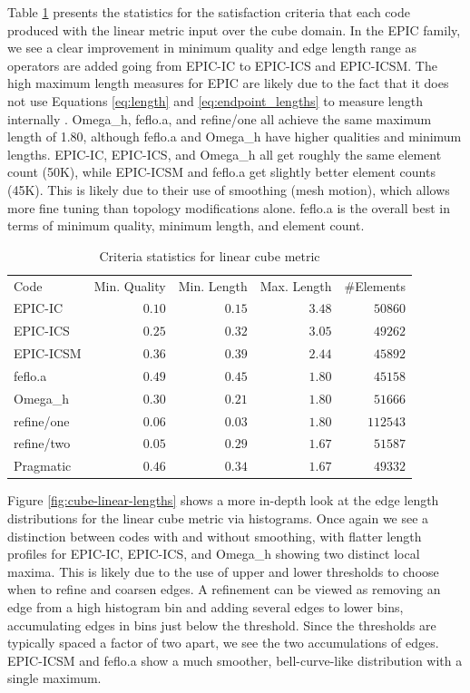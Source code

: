 \documentclass[3p,times,procedia,number]{elsarticle}
\begin{document}
Table \ref{tab:cube-linear-stats} presents the statistics
for the satisfaction criteria that each code
produced with the linear metric input over the cube domain.
In the EPIC family, we see a clear improvement in minimum
quality and edge length range as operators are added
going from EPIC-IC to EPIC-ICS and EPIC-ICSM.
The high maximum length measures for EPIC are likely due
to the fact that it does not use Equations \ref{eq:length}
and \ref{eq:endpoint_lengths} to measure length
internally \cite{park-loseille-krakos-michal-adapt-decomposition}.
Omega\_h, feflo.a, and refine/one
all achieve the same maximum length of 1.80, although
feflo.a and Omega\_h have higher qualities
and minimum lengths.
EPIC-IC, EPIC-ICS, and Omega\_h all get roughly
the same element count (50K), while EPIC-ICSM and feflo.a
get slightly better element counts (45K).
This is likely due to their use of smoothing (mesh motion),
which allows more fine tuning than topology modifications alone.
feflo.a is the overall best in terms of minimum
quality,
minimum length, and element count.

\begin{table}
\caption{Criteria statistics for linear cube metric}
\label{tab:cube-linear-stats}
\begin{tabular}{lrrrr}
Code & Min. Quality & Min. Length & Max. Length & \#Elements\\
EPIC-IC     & $0.10$&       $0.15$&       $3.48$&   $ 50860$\\
EPIC-ICS    & $0.25$&       $0.32$&       $3.05$&   $ 49262$\\
EPIC-ICSM   & $0.36$&       $0.39$&       $2.44$&   $ 45892$\\
feflo.a     & $0.49$&       $0.45$&       $1.80$&   $ 45158$\\
Omega\_h    & $0.30$&       $0.21$&       $1.80$&   $ 51666$\\
refine/one  & $0.06$&       $0.03$&       $1.80$&   $112543$\\
refine/two  & $0.05$&       $0.29$&       $1.67$&   $ 51587$\\
Pragmatic   & $0.46$&       $0.34$&       $1.67$&   $ 49332$\\
\end{tabular}
\end{table}

Figure \ref{fig:cube-linear-lengths} shows a more in-depth look
at the edge length distributions for the linear cube metric
via histograms.
Once again we see a distinction between codes with and without
smoothing, with flatter length profiles
for EPIC-IC, EPIC-ICS, and Omega\_h showing two distinct local maxima.
This is likely due to the use of upper and lower thresholds
to choose when to refine and coarsen edges.
A refinement can be viewed as removing an edge from a high
histogram bin and adding several edges to lower bins,
accumulating edges in bins just below the threshold.
Since the thresholds are typically spaced a factor of two apart,
we see the two accumulations of edges.
EPIC-ICSM and feflo.a show a much smoother, bell-curve-like distribution
with a single maximum.
\end{document}
